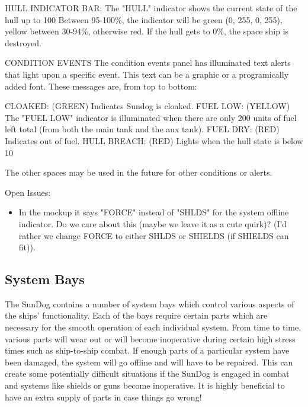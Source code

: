 \begin{itemize}
HULL INDICATOR BAR:
The "HULL" indicator shows the current state of the hull up to 100%
Between 95-100\%, the indicator will be green (0, 255, 0, 255),
yellow between 30-94\%, otherwise red.  If the hull gets to 0\%, the
space ship is destroyed.  

CONDITION EVENTS
The condition events panel has illuminated text alerts that light upon a specific event. This text can be a graphic or a programically added font. These messages are, from top to bottom:

CLOAKED: (GREEN) Indicates Sundog is cloaked. 
FUEL LOW: (YELLOW) The "FUEL LOW" indicator is illuminated when there are only 200 units
of fuel left total (from both the main tank and the aux tank).
FUEL DRY: (RED) Indicates out of fuel. 
HULL BREACH: (RED) Lights when the hull state is below 10%

The other spaces may be used in the future for other conditions or alerts. 
 


Open Issues:
\begin{itemize}
\item In the mockup it says "FORCE" instead of "SHLDS" for the system
offline indicator.  Do we care about this (maybe we leave it as a cute
quirk)? (I'd rather we change FORCE to either SHLDS or SHIELDS (if SHIELDS can fit)). 
\end{itemize}

\subsection{System Bays}
The SunDog contains a number of system bays which control various aspects of
the ships' functionality.  Each of the bays require certain parts which are
necessary for the smooth operation of each individual system.  From time to
time, various parts will wear out or will become inoperative during certain
high stress times such as ship-to-ship combat.  If enough parts of a particular
system have been damaged, the system will go offline and will have to be
repaired.  This can create some potentially difficult situations if the
SunDog is engaged in combat and systems like shields or guns become
inoperative.  It is highly beneficial to have an extra supply of parts in
case things go wrong!


\end{itemize}
